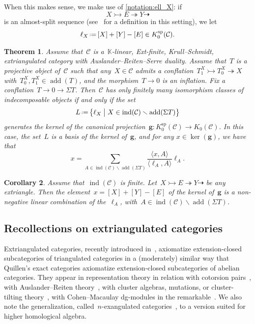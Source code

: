 \documentclass{amsart}
\newtheorem{theorem}{Theorem}[section]
\newtheorem{corollary}[theorem]{Corollary}
\theoremstyle{definition}
\renewcommand{\b}[1]{{\boldsymbol{#1}}} %
\newcommand{\bigset}[2]{\big\{ #1 \;\big|\; #2 \big\}} %
\newcommand{\ssm}{\smallsetminus} %
\newcommand{\eqdef}{\mbox{\,\raisebox{0.2ex}{\scriptsize\ensuremath{\mathrm:}}\ensuremath{=}\,}} %
\newcommand{\field}{\mathbb{K}}
\newcommand{\cat}{\mathcal{C}}
\newcommand{\susp}{\Sigma}
\newcommand{\add}{\operatorname{add}}
\newcommand{\spl}{\operatorname{sp}}
\newcommand{\Ksp}{K_0^{\spl}}
\newcommand{\ind}{\operatorname{ind}}
\newcommand{\infl}{\rightarrowtail}
\newcommand{\defl}{\twoheadrightarrow}
\newcommand{\kzero}[1]{K_0(#1)}
\begin{document}
When this makes sense, we make use of \cref{notation:ell_X}: if
\[
X \infl E \defl Y \dashrightarrow
\]
is an almost-split sequence (see~\cite{IyamaNakaokaPalu} for a definition in this setting), we let
\[
\ell_X \eqdef [X]+[Y]-[E]\in\Ksp(\cat).
\]

\begin{theorem}
\label{thm:extricats}
Assume that~$\cat$ is a~$\field$-linear, Ext-finite, Krull--Schmidt, extriangulated category with Auslander--Reiten--Serre duality.
Assume that~$T$ is a projective object of~$\cat$ such that any~$X\in\cat$ admits a conflation~$T_1^X\infl T_0^X\defl X$ with~$T_0^X, T_1^X\in\add(T)$, and the morphism~$T\to 0$ is an inflation. Fix a conflation~$T\to 0 \to \susp T$. Then~$\cat$ has only finitely many isomorphism classes of indecomposable objects if and only if the set
\[
L \eqdef \bigset{\ell_X}{X \in \ind(\cat) \ssm \add(\susp T)}
\]
generates the kernel of the canonical projection~$\b{g}:\Ksp(\cat) \to \kzero{\cat}$. 
In this case, the set~$L$ is a basis of the kernel of~$\b{g}$, and for any $x \in \ker(\b{g})$, we have that
\[
x= \sum_{A \in \ind(\cat) \ssm \add(\susp T)} \frac{\langle x, A \rangle}{\langle \ell_A, A \rangle} \ell_A.
\]
\end{theorem}

\begin{corollary}
\label{coro:meshes positively generate extricats}
Assume that~$\ind(\cat)$ is finite.
Let~$X\infl E\defl Y\dashrightarrow$ be any extriangle.
Then the element~$x=[X]+[Y]-[E]$ of the kernel of~$\b{g}$ is a non-negative linear combination of the~$\ell_A$, with~$A\in\ind(\cat)\ssm \add(\susp T)$.
\end{corollary}


\subsection{Recollections on extriangulated categories}
\label{sec:recollections extricats}

Extriangulated categories, recently introduced in~\cite{NakaokaPalu}, axiomatize extension-closed subcategories of triangulated categories in a (moderately) similar way that Quillen's exact categories axiomatize extension-closed subcategories of abelian categories.
They appear in representation theory in relation with cotorsion pairs~\cite{ChangZhouZhu-ClusterSubalgebras,ZhaoHuang-Phantom,LiuNakaoka-Hearts,Liu-LocalizationsHearts}, with Auslander--Reiten theory~\cite{IyamaNakaokaPalu}, with cluster algebras, mutations, or cluster-tilting theory~\cite{ChangZhouZhu-ClusterSubalgebras,Pressland,ZhouZhu-TriangulatedQuotient,LiuZhou-Abelian,LiuZhou-AbelianII,LiuZhou-Gorenstein}, with Cohen--Macaulay dg-modules in the remarkable~\cite{Jin}.
We also note the generalization, called~$n$-exangulated categories~\cite{HerschendLiuNakaokaI,HerschendLiuNakaokaII}, to a version suited for higher homological algebra.
\end{document}
